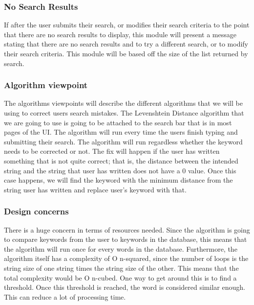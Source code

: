 \documentclass[journal,compsoc, 10pt, draftclsnofoot, onecolumn]{IEEEtran}
\begin{document}
\subsubsection*{No Search Results}
If after the user submits their search, or modifies their search criteria to the
 point that there are no search results to display, this module will present a 
message stating that there are no search results and to try a different search, 
or to modify their search criteria. This module will be based off the size of 
the list returned by search.

\subsubsection{Algorithm viewpoint}
The algorithms viewpoints will describe the different algorithms that we will be
 using to correct users search mistakes. The Levenshtein Distance algorithm that 
we are going to use is going to be attached to the search bar that is in most 
pages of the UI. The algorithm will run every time the users finish typing and 
submitting their search. The algorithm will run regardless whether the keyword 
needs to be corrected or not. The fix will happen if the user has written 
something that is not quite correct; that is, the distance between the intended 
string and the string that user has written does not have a 0 value. Once this 
case happens, we will find the keyword with the minimum distance from the string 
user has written and replace user's keyword with that.

\subsubsection*{Design concerns}
There is a huge concern in terms of resources needed. Since the algorithm is 
going to compare keywords from the user to keywords in the database, this 
means that the algorithm will run once for every words in the database. 
Furthermore, the algorithm itself has a complexity of O n-squared, since the 
number of loops is the string size of one string times the string size of the 
other. This means that the total complexity would be O n-cubed. One way to get 
around this is to find a threshold. Once this threshold is reached, the word 
is considered similar enough. This can reduce a lot of processing time.
\end{document}
